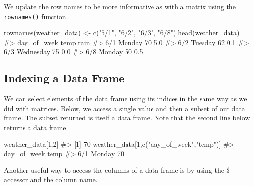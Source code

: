 \documentclass[
  letterpaper,
]{krantz}
\makeatletter
\newenvironment{Shaded}{\begin{snugshade}}{\end{snugshade}}
\newcommand{\CommentTok}[1]{\textcolor[rgb]{0.37,0.37,0.37}{#1}}
\newcommand{\DecValTok}[1]{\textcolor[rgb]{0.68,0.00,0.00}{#1}}
\newcommand{\FunctionTok}[1]{\textcolor[rgb]{0.28,0.35,0.67}{#1}}
\newcommand{\NormalTok}[1]{\textcolor[rgb]{0.00,0.23,0.31}{#1}}
\newcommand{\OtherTok}[1]{\textcolor[rgb]{0.00,0.23,0.31}{#1}}
\newcommand{\SpecialCharTok}[1]{\textcolor[rgb]{0.37,0.37,0.37}{#1}}
\newcommand{\StringTok}[1]{\textcolor[rgb]{0.13,0.47,0.30}{#1}}
\newenvironment{kframe}{%
\medskip{}
\setlength{\fboxsep}{.8em}
 \def\at@end@of@kframe{}%
 \ifinner\ifhmode%
  \def\at@end@of@kframe{\end{minipage}}%
  \begin{minipage}{\columnwidth}%
 \fi\fi%
 \def\FrameCommand##1{\hskip\@totalleftmargin \hskip-\fboxsep
 \colorbox{shadecolor}{##1}\hskip-\fboxsep
     \hskip-\linewidth \hskip-\@totalleftmargin \hskip\columnwidth}%
 \MakeFramed {\advance\hsize-\width
   \@totalleftmargin\z@ \linewidth\hsize
   \@setminipage}}%
 {\par\unskip\endMakeFramed%
 \at@end@of@kframe}
\renewenvironment{Shaded}{\begin{kframe}}{\end{kframe}}
\makeatother
\begin{document}
We update the row names to be more informative as with a matrix using
the \texttt{rownames()} function.

\begin{Shaded}
\begin{Highlighting}[]
\FunctionTok{rownames}\NormalTok{(weather\_data) }\OtherTok{\textless{}{-}} \FunctionTok{c}\NormalTok{(}\StringTok{"6/1"}\NormalTok{, }\StringTok{"6/2"}\NormalTok{, }\StringTok{"6/3"}\NormalTok{, }\StringTok{"6/8"}\NormalTok{)}
\FunctionTok{head}\NormalTok{(weather\_data)}
\CommentTok{\#\textgreater{}     day\_of\_week temp rain}
\CommentTok{\#\textgreater{} 6/1      Monday   70  5.0}
\CommentTok{\#\textgreater{} 6/2     Tuesday   62  0.1}
\CommentTok{\#\textgreater{} 6/3   Wednesday   75  0.0}
\CommentTok{\#\textgreater{} 6/8      Monday   50  0.5}
\end{Highlighting}
\end{Shaded}

\hypertarget{indexing-a-data-frame}{%
\subsection{Indexing a Data Frame}\label{indexing-a-data-frame}}

We can select elements of the data frame using its indices in the same
way as we did with matrices. Below, we access a single value and then a
subset of our data frame. The subset returned is itself a data frame.
Note that the second line below returns a data frame.

\begin{Shaded}
\begin{Highlighting}[]
\NormalTok{weather\_data[}\DecValTok{1}\NormalTok{,}\DecValTok{2}\NormalTok{]}
\CommentTok{\#\textgreater{} [1] 70}
\NormalTok{weather\_data[}\DecValTok{1}\NormalTok{,}\FunctionTok{c}\NormalTok{(}\StringTok{"day\_of\_week"}\NormalTok{,}\StringTok{"temp"}\NormalTok{)]}
\CommentTok{\#\textgreater{}     day\_of\_week temp}
\CommentTok{\#\textgreater{} 6/1      Monday   70}
\end{Highlighting}
\end{Shaded}

Another useful way to access the columns of a data frame is by using the
\$ accessor and the column name.

\begin{Shaded}
\end{Shaded}
\end{document}

